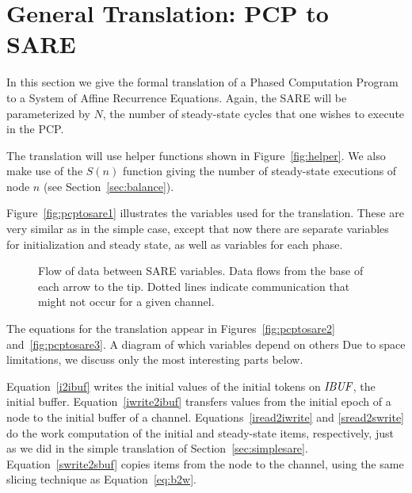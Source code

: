 \section{General Translation: PCP to SARE}
\label{sec:translate}

In this section we give the formal translation of a Phased Computation
Program to a System of Affine Recurrence Equations.  Again, the SARE
will be parameterized by $N$, the number of steady-state cycles that
one wishes to execute in the PCP.  

The translation will use helper functions shown in
Figure~\ref{fig:helper}.  We also make use of the $S(n)$ function
giving the number of steady-state executions of node $n$ (see
Section~\ref{sec:balance}).



Figure~\ref{fig:pcptosare1} illustrates the variables used for the
translation.  These are very similar as in the simple case, except
that now there are separate variables for initialization and steady
state, as well as variables for each phase.

\begin{figure}
\centering
{}
\parbox{4in}{\caption{Flow of data between SARE variables.  Data flows from the base of each arrow to the tip.  Dotted lines indicate communication that might not occur for a given channel.}
\protect\label{fig:communic}}
\end{figure}

The equations for the translation appear in
Figures~\ref{fig:pcptosare2} and~\ref{fig:pcptosare3}.  A diagram of
which variables depend on others Due to space limitations, we discuss
only the most interesting parts below.

Equation~\ref{i2ibuf} writes the initial values of the initial tokens
on $\mbox{\it IBUF}$, the initial buffer.  Equation~\ref{iwrite2ibuf}
transfers values from the initial epoch of a node to the initial buffer
of a channel.  Equations~\ref{iread2iwrite} and \ref{sread2swrite} do
the work computation of the initial and steady-state items,
respectively, just as we did in the simple translation of
Section~\ref{sec:simplesare}.  Equation~\ref{swrite2sbuf} copies items
from the node to the channel, using the same slicing technique as
Equation~\ref{eq:b2w}.

